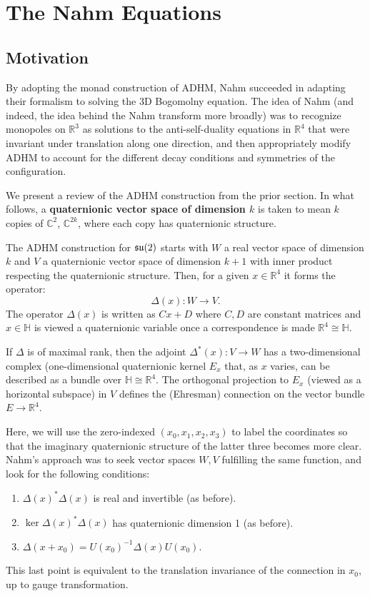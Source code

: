 	\section{The Nahm Equations}
	\subsection{Motivation}
	By adopting the monad construction of ADHM, Nahm succeeded in adapting their formalism to solving the 3D Bogomolny equation. The idea of Nahm (and indeed, the idea behind the Nahm transform more broadly) was to recognize monopoles on $\mathbb R^3$ as solutions to the anti-self-duality equations in $\mathbb R^4$ that were invariant under translation along one direction, and then appropriately modify ADHM to account for the different decay conditions and symmetries of the configuration.

	We present a review of the ADHM construction from the prior section. In what follows, a \textbf{quaternionic vector space of dimension $k$} is taken to mean $k$ copies of $\mathbb C^2$, $\mathbb C^{2k}$, where each copy has quaternionic structure. 

	\begin{review}
		The ADHM construction for $\frak{su}(2)$ starts with $W$ a real vector space of dimension $k$ and $V$ a quaternionic vector space of dimension $k+1$ with inner product respecting the quaternionic structure. Then, for a given $x\in\mathbb R^4$ it forms the operator:
		\begin{equation}
			\Delta(x): W \to V.
		\end{equation}
		The operator $\Delta(x)$ is written as $Cx + D$ where $C, D$ are constant matrices and $x \in \mathbb H$ is viewed a quaternionic variable once a correspondence is made $\mathbb R^4 \cong \mathbb H$.
		
		If $\Delta$ is of maximal rank, then the adjoint $\Delta^*(x): V \to W$ has a two-dimensional complex (one-dimensional quaternionic kernel $E_x$ that, as $x$ varies, can be described as a bundle over $\mathbb H \cong \mathbb R^4$. The orthogonal projection to $E_x$ (viewed as a horizontal subspace) in $V$ defines the (Ehresman) connection on the vector bundle $E \to \mathbb R^4$. \cite{hitchin1983}
	\end{review}

	Here, we will use the zero-indexed $(x_0, x_1, x_2, x_3)$ to label the coordinates so that the imaginary quaternionic structure of the latter three becomes more clear. Nahm's approach \cite{nahm1982} was to seek vector spaces $W, V$ fulfilling the same function, and look for the following conditions:
	\begin{enumerate}
		\item $\Delta(x)^* \Delta(x)$ is real and invertible (as before).
		\item $\ker \Delta(x)^* \Delta(x)$ has quaternionic dimension 1 (as before).
		\item $\Delta(x + x_0) = U(x_0)^{-1} \Delta(x) U(x_0)$.
	\end{enumerate}
	This last point is equivalent to the translation invariance of the connection in $x_0$, up to gauge transformation.

